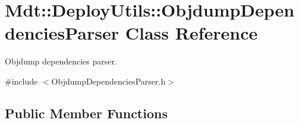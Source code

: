 \hypertarget{class_mdt_1_1_deploy_utils_1_1_objdump_dependencies_parser}{}\section{Mdt\+:\+:Deploy\+Utils\+:\+:Objdump\+Dependencies\+Parser Class Reference}
\label{class_mdt_1_1_deploy_utils_1_1_objdump_dependencies_parser}


Objdump dependencies parser.  




{\ttfamily \#include $<$Objdump\+Dependencies\+Parser.\+h$>$}

\subsection*{Public Member Functions}
